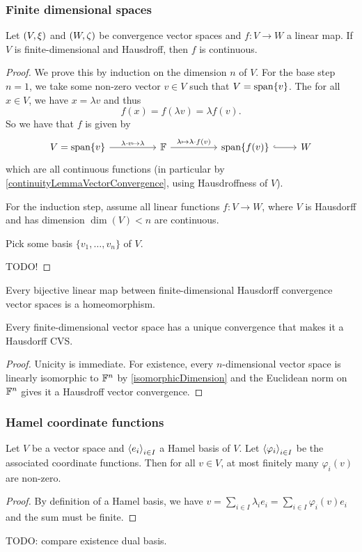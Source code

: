 \subsubsection{Finite dimensional spaces}
\begin{proposition}
Let $\left( V,\xi \right)$ and $\left( W,\zeta \right)$ be convergence vector spaces and $f: V\to W$ a linear map. If $V$ is finite-dimensional and Hausdroff, then $f$ is continuous.
\end{proposition}
\begin{proof}
We prove this by induction on the dimension $n$ of $V$. For the base step $n=1$, we take some non-zero vector $v\in V$ such that $V = \operatorname{span}\{v\}$. The for all $x\in V$, we have $x= \lambda v$ and thus
\[ f(x) = f(\lambda v) = \lambda f(v). \]
So we have that $f$ is given by
\[ \begin{tikzcd}
V = \Span\{v\} \arrow[rr, "\lambda\cdot v\mapsto \lambda"] && \F \arrow[rr, "\lambda\mapsto \lambda \cdot f(v)"] && \Span\{f(v)\} \arrow[r, hook] & W
\end{tikzcd} \]
which are all continuous functions (in particular by \ref{continuityLemmaVectorConvergence}, using Hausdroffness of $V$).

For the induction step, assume all linear functions $f: V\to W$, where $V$ is Hausdorff and has dimension $\dim(V)< n$ are continuous.

Pick some basis $\{v_1, \ldots, v_n\}$ of $V$.

TODO!
\end{proof}
\begin{corollary}
Every bijective linear map between finite-dimensional Hausdorff convergence vector spaces is a homeomorphism.
\end{corollary}
\begin{corollary}
Every finite-dimensional vector space has a unique convergence that makes it a Hausdorff CVS.
\end{corollary}
\begin{proof}
Unicity is immediate. For existence, every $n$-dimensional vector space is linearly isomorphic to $\mathbb{F}^n$ by \ref{isomorphicDimension} and the Euclidean norm on $\mathbb{F}^n$ gives it a Hausdroff vector convergence. 
\end{proof}

\subsubsection{Hamel coordinate functions}
\begin{lemma} \label{finiteNonZeroHamelCoordinateFunctions}
Let $V$ be a vector space and $\left\langle e_i \right\rangle_{i\in I}$ a Hamel basis of $V$. Let $\left\langle \varphi_i \right\rangle_{i\in I}$ be the associated coordinate functions. Then for all $v\in V$, at most finitely many $\varphi_i(v)$ are non-zero.
\end{lemma}
\begin{proof}
By definition of a Hamel basis, we have $v = \sum_{i\in I}\lambda_i e_i = \sum_{i\in I}\varphi_i(v) e_i$ and the sum must be finite.
\end{proof}
TODO: compare existence dual basis.

